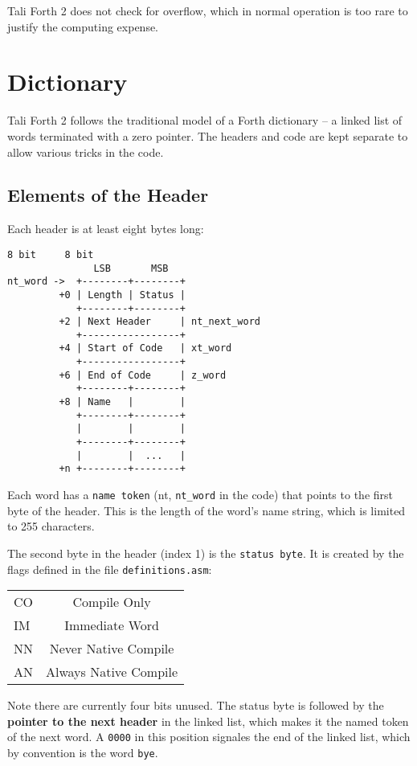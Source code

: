 Tali Forth 2 does not check for overflow, which in normal operation is too rare to
justify the computing expense. 

\section{Dictionary}


Tali Forth 2 follows the traditional model of a Forth dictionary -- a linked list
of words terminated with a zero pointer. The headers and code are kept separate
to allow various tricks in the code.


\subsection{Elements of the Header}

Each header is at least eight bytes long:

\begin{lstlisting}[frame=single]
              8 bit     8 bit
               LSB       MSB
nt_word ->  +--------+--------+
         +0 | Length | Status |
            +--------+--------+
         +2 | Next Header     | nt_next_word
            +-----------------+
         +4 | Start of Code   | xt_word 
            +-----------------+
         +6 | End of Code     | z_word
            +--------+--------+
         +8 | Name   |        |
            +--------+--------+
            |        |        |
            +--------+--------+
            |        |  ...   |
         +n +--------+--------+
\end{lstlisting}

Each word has a \texttt{name token} (nt, \texttt{nt\_word} in the code) that
points to the first byte of the header. This is the length of the word's name
string, which is limited to 255 characters. 

The second byte in the header (index 1) is the \texttt{status byte}. It is created by
the flags defined in the file \texttt{definitions.asm}: 

\begin{tabular}{ l c }
        CO & Compile Only\\
        IM & Immediate Word\\
        NN & Never Native Compile\\
        AN & Always Native Compile\\
\end{tabular}

Note there are currently four bits unused. The status byte is followed by the
\textbf{pointer to the next header} in the linked list, which makes it the named
token of the next word. A \texttt{0000} in this position signales the end of the
linked list, which by convention is the word \texttt{bye}. 

